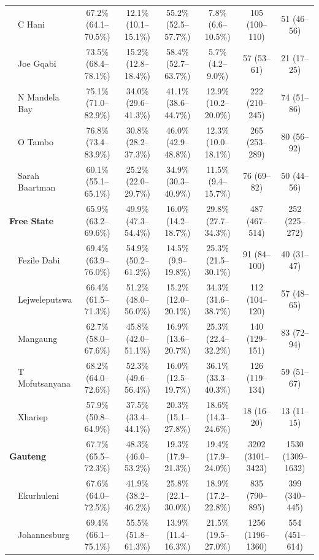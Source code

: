 \documentclass{article}
\begin{document}
\begin{landscape}
{\begin{longtable}[c]{llc cc ccc}
      & C Hani & 67.2\% (64.1--70.5\%) & 12.1\% (10.1--15.1\%) & 55.2\% (52.5--57.7\%) & 7.8\% (6.6--10.5\%) & 105 (100--110) & 51 (46--56) \\
      & Joe Gqabi & 73.5\% (68.4--78.1\%) & 15.2\% (12.8--18.4\%) & 58.4\% (52.7--63.7\%) & 5.7\% (4.2--9.0\%) & 57 (53--61) & 21 (17--25) \\
      & N Mandela Bay & 75.1\% (71.0--82.9\%) & 34.0\% (29.6--41.3\%) & 41.1\% (38.6--44.7\%) & 12.9\% (10.2--20.0\%) & 222 (210--245) & 74 (51--86) \\
      & O Tambo & 76.8\% (73.4--83.9\%) & 30.8\% (28.2--37.3\%) & 46.0\% (42.9--48.8\%) & 12.3\% (10.0--18.1\%) & 265 (253--289) & 80 (56--92) \\
      & Sarah Baartman & 60.1\% (55.1--65.1\%) & 25.2\% (22.0--29.7\%) & 34.9\% (30.3--40.9\%) & 11.5\% (9.4--15.7\%) & 76 (69--82) & 50 (44--56) \\[5pt]
      \multicolumn{2}{l}{\textbf{Free State}}  & 65.9\% (63.2--69.6\%) & 49.9\% (47.3--54.4\%) & 16.0\% (14.2--18.7\%) & 29.8\% (27.7--34.3\%) & 487 (467--514) & 252 (225--272) \\
      & Fezile Dabi & 69.4\% (63.9--76.0\%) & 54.9\% (50.2--61.2\%) & 14.5\% (9.9--19.8\%) & 25.3\% (21.5--30.1\%) & 91 (84--100) & 40 (31--47) \\
      & Lejweleputswa & 66.4\% (61.5--71.3\%) & 51.2\% (48.0--56.0\%) & 15.2\% (12.0--20.1\%) & 34.3\% (31.6--38.7\%) & 112 (104--120) & 57 (48--65) \\
      & Mangaung & 62.7\% (58.0--67.6\%) & 45.8\% (42.0--51.1\%) & 16.9\% (13.6--20.7\%) & 25.3\% (22.4--32.2\%) & 140 (129--151) & 83 (72--94) \\
      & T Mofutsanyana & 68.2\% (64.0--72.6\%) & 52.3\% (49.6--56.4\%) & 16.0\% (12.5--19.7\%) & 36.1\% (33.3--40.3\%) & 126 (119--134) & 59 (51--67) \\
      & Xhariep & 57.9\% (50.8--64.9\%) & 37.5\% (33.4--44.1\%) & 20.3\% (15.1--27.8\%) & 18.6\% (14.3--24.6\%) & 18 (16--20) & 13 (11--15) \\[5pt]
      \multicolumn{2}{l}{\textbf{Gauteng}}  & 67.7\% (65.5--72.3\%) & 48.3\% (46.0--53.2\%) & 19.3\% (17.9--21.3\%) & 19.4\% (17.9--24.0\%) & 3202 (3101--3423) & 1530 (1309--1632) \\
      & Ekurhuleni & 67.6\% (64.0--72.5\%) & 41.9\% (38.2--46.2\%) & 25.8\% (22.1--30.0\%) & 18.9\% (17.2--22.8\%) & 835 (790--895) & 399 (340--445) \\
      & Johannesburg & 69.4\% (66.1--75.1\%) & 55.5\% (51.8--61.3\%) & 13.9\% (11.4--16.3\%) & 21.5\% (19.5--27.0\%) & 1256 (1196--1360) & 554 (451--614) \\

\end{longtable}}
\end{landscape}
\end{document}

